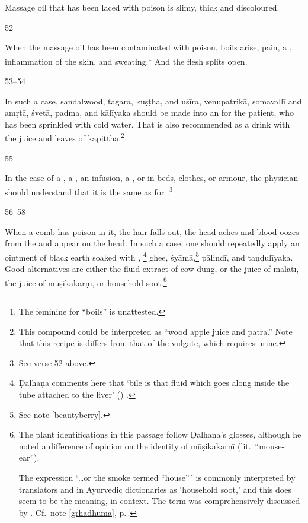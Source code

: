 \begin{translation}
Massage oil that has been laced with poison is slimy, thick and discoloured.   

\item[52]

When the massage oil has been contaminated with poison, boils arise,
pain, a , inflammation of the skin, and
sweating.\footnote{The feminine  for “boils” is unattested.}
    And the flesh splits open.

\item[53--54]

In such a case, sandalwood, \gls{tagara}, \gls{kuṣṭha}, and 
\gls{uśīra}, 
\gls{veṇupatrikā}, 
\gls{somavallī}
and 
\gls{amṛtā}, 
\gls{śvetā}, 
\gls{padma}, and 
\gls{kālīyaka} should be made into an
 for the patient, who has been sprinkled with cold 
water.
That is also recommended as a drink with the juice and leaves of
\gls{kapittha}.\footnote{This compound could be interpreted as 
“wood
apple juice and \gls{patra}.”  Note that this recipe is differs
from that of the vulgate, which requires urine.}
 
 \item[55]
 
In the case of a , a , an infusion, a
, or in beds, clothes, or armour, the physician 
should understand that it is the same as for 
.\footnote{See verse 52 above.}
 
 \item[56--58]
 
 When a comb has poison in it, the hair falls out, the head aches and blood
oozes from the  and  appear on the
head. In such a case, one should repeatedly apply an ointment of black earth
soaked with ,
\label{fluidbile}\footnote{Ḍalhaṇa comments here that `bile is that fluid
    which goes along inside the tube attached to the liver'
    ()
    .} ghee, \gls{śyāmā},\footnote{See note \ref{beautyberry}.}
        \gls{pālindī},
        and \gls{taṇḍulīyaka}.
        Good alternatives are either the fluid extract of cow-dung, or the juice of
        \gls{mālatī}, 
        the juice of \gls{mūṣikakarṇī},
        or household soot.\footnote{The plant identifications in this passage follow
            Ḍalhaṇa's glosses, although he noted a difference of opinion on the identity
            of \gls{mūṣikakarṇī} (lit.\ “mouse-ear”). \par The expression  `\ldots or the smoke termed ``house''\,' is commonly
            interpreted by translators and in Ayurvedic dictionaries as `household soot,'
            and this does seem to be the meaning, in context.  The term was
            comprehensively discussed by \citet[443]{meul-2008}. Cf.\ note
            \ref{grhadhuma}, p.\,\pageref{grhadhuma}.\label{soot}}
 

\end{translation}
